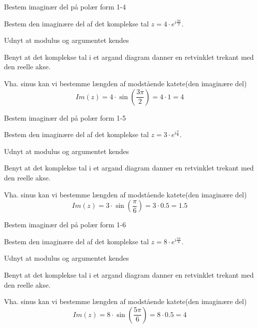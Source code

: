 \documentclass{article}
\begin{document}
\newpage

\begin{exercise}{Bestem imaginær del på polær form 1-4}
	
	Bestem den imaginære del af det komplekse tal $z=4 \cdot e^{i \frac{3 \pi}{2}}$.



	\hint 

	Udnyt at modulus og argumentet kendes


	\hint

	Benyt at det komplekse tal i et argand diagram danner en retvinklet trekant med den reelle akse. 

	\hint 

	Vha. sinus kan vi bestemme længden af modstående katete(den imaginære del)
	\[
	Im(z) =  4 \cdot \sin\left(\frac{3 \pi}{2}\right) = 4 \cdot 1 = 4
	\]
	\end{exercise}

\newpage

\begin{exercise}{Bestem imaginær del på polær form 1-5}
	
	Bestem den imaginære del af det komplekse tal $z=3 \cdot e^{i \frac{\pi}{6}}$.
	
	
	
	\hint 
	
	Udnyt at modulus og argumentet kendes
	
	
	\hint
	
	Benyt at det komplekse tal i et argand diagram danner en retvinklet trekant med den reelle akse. 
	
	\hint 
	
	Vha. sinus kan vi bestemme længden af modstående katete(den imaginære del)
	\[
	Im(z) =  3 \cdot \sin\left(\frac{\pi}{6}\right) = 3 \cdot 0.5 = 1.5
	\]
	
\end{exercise}

\newpage

\begin{exercise}{Bestem imaginær del på polær form 1-6}
	
	Bestem den imaginære del af det komplekse tal $z=8 \cdot e^{i \frac{5 \pi}{6}}$.
	
	
	
	\hint 
	
	Udnyt at modulus og argumentet kendes
	
	
	\hint
	
	Benyt at det komplekse tal i et argand diagram danner en retvinklet trekant med den reelle akse. 
	
	\hint 
	
	Vha. sinus kan vi bestemme længden af modstående katete(den imaginære del)
	\[
	Im(z) =  8 \cdot \sin\left(\frac{5\pi}{6}\right) = 8 \cdot 0.5 = 4
	\]
	
\end{exercise}
\end{document}
